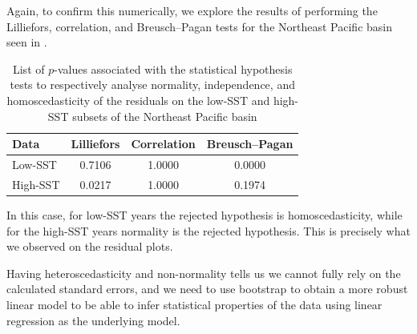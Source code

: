 Again, to confirm this numerically, we explore the results of performing the Lilliefors, correlation, and Breusch--Pagan tests for the Northeast Pacific basin seen in .
\begin{table}[H]
	\centering
	\begin{tabular}{lccc}
		\toprule
		\toprule
		Data     & Lilliefors   & Correlation  & Breusch--Pagan \\
		\midrule
		Low-SST  & \num{0.7106} & \num{1.0000} & \num{0.0000}   \\
		High-SST & \num{0.0217} & \num{1.0000} & \num{0.1974}   \\
		\bottomrule
	\end{tabular}
	\caption{List of $p$-values associated with the statistical hypothesis tests to respectively analyse normality, independence, and homoscedasticity of the residuals on the low-SST and high-SST subsets of the Northeast Pacific basin}
	\label{tab:stat-tests-epac}
\end{table}
In this case, for low-SST years the rejected hypothesis is homoscedasticity, while for the high-SST years normality is the rejected hypothesis. This is precisely what we observed on the residual plots.

\bigskip
Having heteroscedasticity and non-normality tells us we cannot fully rely on the calculated standard errors, and we need to use bootstrap to obtain a more robust linear model to be able to infer statistical properties of the data using linear regression as the underlying model.
